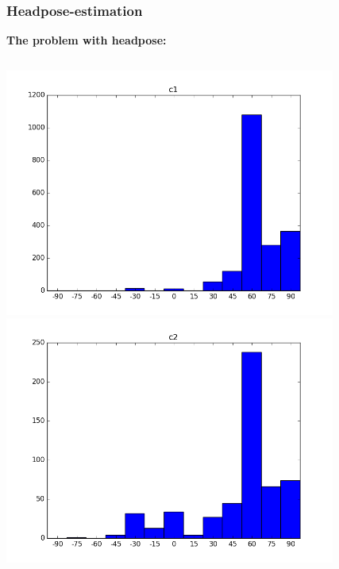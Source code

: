 \documentclass{beamer}
\begin{document}
	\begin{frame}
		\frametitle{Headpose-estimation}
        \textbf{The problem with headpose:}
		\begin{columns}
		 	\begin{column}{0.5\textwidth}
		 		\begin{center}
		 			\includegraphics[width=0.85\textwidth]{headpose_evaluation_c1}\\
		 			\includegraphics[width=0.85\textwidth]{headpose_evaluation_c2}
		 		\end{center}
		 	\end{column}
		 	\begin{column}{0.5\textwidth}
		 		\begin{center}

\end{center}
\end{column}
\end{columns}
\end{frame}
\end{document}
